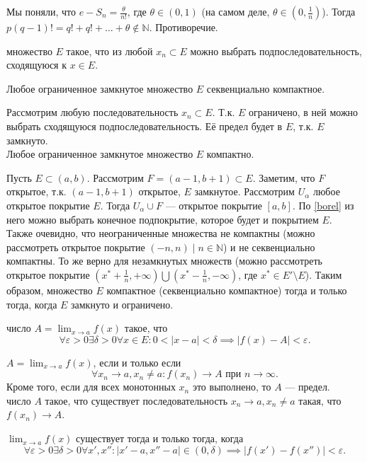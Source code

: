 \documentclass[12pt,a4paper]{article}
\begin{document}
Мы поняли, что $e-S_n=\frac{\theta}{n!}$, где $\theta\in(0,1)$ (на самом деле, $\theta\in(0,\frac{1}{n})$). Тогда $p(q-1)!=q!+q!+\ldots +\theta\not\in \mathbb N $. Противоречие.\QEDA\\

\newpage

 множество $E$ такое, что из любой $x_n\subset E$ можно выбрать подпоследовательность, сходящуюся к $x\in E$.

\theorem Любое ограниченное замкнутое множество $E$ секвенциально компактное.

\proof Рассмотрим любую последовательность $x_n\subset E$. Т.к. $E$ ограничено, в ней можно выбрать сходящуюся подпоследовательность. Её предел будет в $E$, т.к. $E$ замкнуто. \QEDA\\

\theorem Любое ограниченное замкнутое множество $E$ компактно.

\proof Пусть $E\subset(a,b)$. Рассмотрим $F=(a-1,b+1)\subset E$. Заметим, что $F$ открытое, т.к. $(a-1,b+1)$ открытое, $E$ замкнутое. Рассмотрим $U_\alpha$ любое открытое покрытие $E$. Тогда $U_\alpha\cup F$ --- открытое покрытие $[a,b]$. По \ref{borel} из него можно выбрать конечное подпокрытие, которое будет и покрытием $E$. \QEDA\\

Также очевидно, что неограниченные множества не компактны (можно рассмотреть открытое покрытие $(-n,n)\mid n\in \mathbb N $) и не секвенциально компактны. То же верно для незамкнутых множеств (можно рассмотреть открытое покрытие $(x^*+\frac{1}{n},+\infty)\bigcup (x^*-\frac{1}{n},-\infty)$, где $x^*\in E'\setminus E$). Таким образом, множество $E$ компактное (секвенциально компактное) тогда и только тогда, когда $E$ замкнуто и ограничено.\\


 число $A=\lim_{x\to a}f(x)$ такое, что \[
	\forall \varepsilon >0\exists \delta>0\forall x\in E:0<|x-a|<\delta\implies |f(x)-A|<\varepsilon.
\]

 $A=\lim_{x\to a}f(x)$, если и только если \[
	\forall x_n\to a,x_n\neq a:f(x_n)\to A\text{ при }n\to \infty.
\] Кроме того, если для всех монотонных $x_n$ это выполнено, то $A$ --- предел.\\

 число $A$ такое, что существует последовательность $x_n\to a,x_n\neq a$ такая, что $f(x_n)\to A$.

 $\lim_{x\to a}f(x)$ существует тогда и только тогда, когда \[
	\forall \varepsilon >0\exists \delta>0\forall x',x'':|x'-a,x''-a|\in(0,\delta)\implies |f(x')-f(x'')|<\varepsilon .\]
\end{document}
